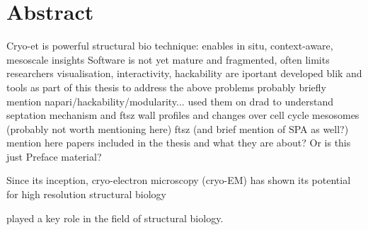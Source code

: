 \section*{Abstract}

\begin{outline}
\1 Cryo-et is powerful structural bio technique: enables in situ, context-aware, mesoscale insights
\1 Software is not yet mature and fragmented, often limits researchers
\1 visualisation, interactivity, hackability are iportant
\1 developed blik and tools as part of this thesis to address the above problems
    \2 probably briefly mention napari/hackability/modularity...
\1 used them on drad to understand septation mechanism and ftsz
    \2 wall profiles and changes over cell cycle
    \2 mesosomes (probably not worth mentioning here)
    \2 ftsz (and brief mention of SPA as well?)
\1 mention here papers included in the thesis and what they are about? Or is this just Preface material?
\end{outline}


Since its inception, cryo-electron microscopy (cryo-EM) has shown its potential for high resolution structural biology

played a key role in the field of structural biology.

